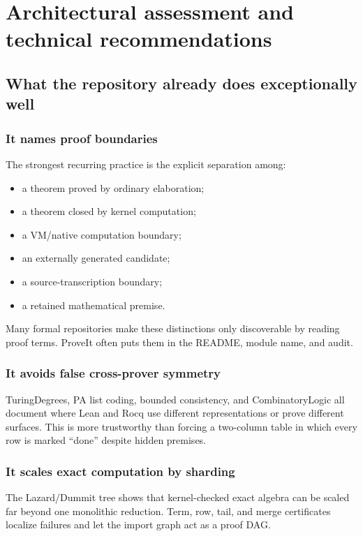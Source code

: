 \documentclass[
  10pt,
  a4paper,
  twoside,
  open=any,
  parskip=half,
  headings=big
]{scrreprt}
\begin{document}
\chapter{Architectural assessment and technical recommendations}
\label{chap:assessment}

\section{What the repository already does exceptionally well}

\subsection{It names proof boundaries}

The strongest recurring practice is the explicit separation among:

\begin{itemize}
  \item a theorem proved by ordinary elaboration;
  \item a theorem closed by kernel computation;
  \item a VM/native computation boundary;
  \item an externally generated candidate;
  \item a source-transcription boundary;
  \item a retained mathematical premise.
\end{itemize}

Many formal repositories make these distinctions only discoverable by reading
proof terms.  ProveIt often puts them in the README, module name, and audit.

\subsection{It avoids false cross-prover symmetry}

TuringDegrees, PA list coding, bounded consistency, and CombinatoryLogic all
document where Lean and Rocq use different representations or prove different
surfaces.  This is more trustworthy than forcing a two-column table in which
every row is marked ``done'' despite hidden premises.

\subsection{It scales exact computation by sharding}

The Lazard/Dummit tree shows that kernel-checked exact algebra can be scaled
far beyond one monolithic reduction.  Term, row, tail, and merge certificates
localize failures and let the import graph act as a proof DAG.
\end{document}
